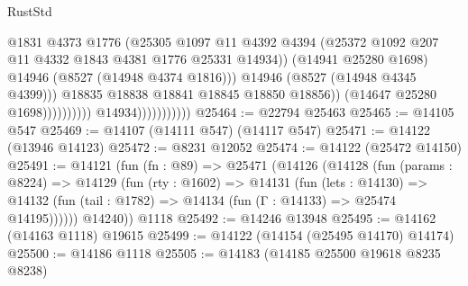 \begin{lexlean}{RustStd}
\begin{coremodule}
                                                    @1831
                                                    @4373
                                                    @1776
                                                    (@25305
                                                      @1097
                                                      @11
                                                      @4392
                                                      @4394
                                                      (@25372
                                                        @1092
                                                        @207
                                                        @11
                                                        @4332
                                                        @1843
                                                        @4381
                                                        @1776
                                                        @25331
                                                        @14934))
                                                    (@14941 @25280 @1698)
                                                    @14946
                                                    (@8527 (@14948 @4374 @1816)))
                                                  @14946
                                                  (@8527 (@14948 @4345 @4399)))
                                                @18835
                                                @18838
                                                @18841
                                                @18845
                                                @18850
                                                @18856))
                                            (@14647 @25280 @1698))))))))))
                          @14934)))))))))))
@25464 := @22794 @25463
@25465 := @14105 @547
@25469 := @14107 (@14111 @547) (@14117 @547)
@25471 := @14122 (@13946 @14123)
@25472 := @8231 @12052
@25474 := @14122 (@25472 @14150)
@25491 := @14121
    (fun (fn : @89) =>
    @25471
      (@14126
        (@14128
          (fun (params : @8224) =>
          @14129
            (fun (rty : @1602) =>
            @14131
              (fun (lets : @14130) =>
              @14132 (fun (tail : @1782) => @14134 (fun (Γ : @14133) => @25474 @14195))))))
        @14240))
    @1118
@25492 := @14246 @13948
@25495 := @14162 (@14163 @1118) @19615
@25499 := @14122 (@14154 (@25495 @14170) @14174)
@25500 := @14186 @1118
@25505 := @14183 (@14185 @25500 @19618 @8235 @8238)

\end{coremodule}
\end{lexlean}
